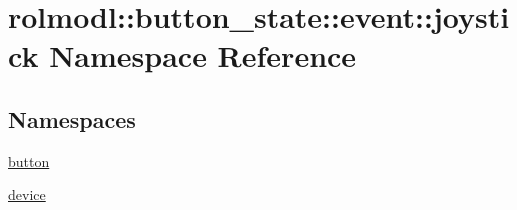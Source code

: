 \hypertarget{namespacerolmodl_1_1button__state_1_1event_1_1joystick}{}\section{rolmodl\+::button\+\_\+state\+::event\+::joystick Namespace Reference}
\label{namespacerolmodl_1_1button__state_1_1event_1_1joystick}
\subsection*{Namespaces}
\begin{DoxyCompactItemize}
\item 
 \mbox{\hyperlink{namespacerolmodl_1_1button__state_1_1event_1_1joystick_1_1button}{button}}
\item 
 \mbox{\hyperlink{namespacerolmodl_1_1button__state_1_1event_1_1joystick_1_1device}{device}}
\end{DoxyCompactItemize}
